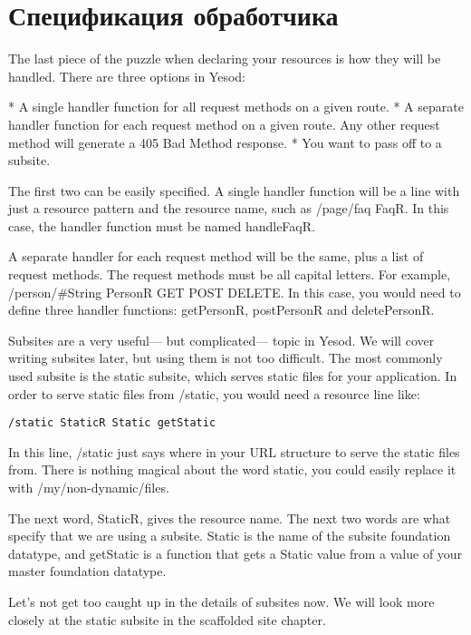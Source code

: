 \section{Спецификация обработчика}

The last piece of the puzzle when declaring your resources is how they
will be handled. There are three options in Yesod:

* A single handler function for all request methods on a given route.
* A separate handler function for each request method on a given route. Any other request method will generate a 405 Bad Method response.
* You want to pass off to a subsite.

The first two can be easily specified. A single handler function will
be a line with just a resource pattern and the resource name, such as
/page/faq FaqR. In this case, the handler function must be named
handleFaqR.

A separate handler for each request method will be the same, plus a
list of request methods. The request methods must be all capital
letters. For example, /person/\#String PersonR GET POST DELETE. In this
case, you would need to define three handler functions: getPersonR,
postPersonR and deletePersonR.

Subsites are a very useful— but complicated— topic in Yesod. We will
cover writing subsites later, but using them is not too difficult. The
most commonly used subsite is the static subsite, which serves static
files for your application. In order to serve static files from
/static, you would need a resource line like:

\begin{verbatim}
/static StaticR Static getStatic
\end{verbatim}

In this line, /static just says where in your URL structure to serve
the static files from. There is nothing magical about the word static,
you could easily replace it with /my/non-dynamic/files.

The next word, StaticR, gives the resource name. The next two words
are what specify that we are using a subsite. Static is the name of
the subsite foundation datatype, and getStatic is a function that gets
a Static value from a value of your master foundation datatype.

Let's not get too caught up in the details of subsites now. We will
look more closely at the static subsite in the scaffolded site
chapter.

